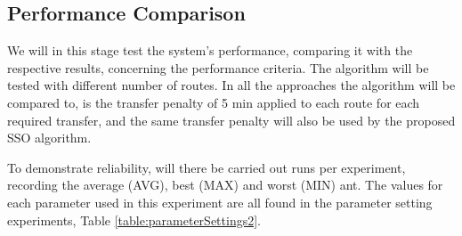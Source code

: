 \subsection{Performance Comparison}
\label{subsec:performanceComparison_setup}
We will in this stage test the system's performance, comparing it with the respective results, concerning the performance criteria. The algorithm will be tested with different number of routes. In all the approaches the algorithm will be compared to, is the transfer penalty of 5 min applied to each route for each required transfer, and the same transfer penalty will also be used by the proposed SSO algorithm.

To demonstrate reliability, will there be carried out runs per experiment, recording the average (AVG), best (MAX) and worst (MIN) ant. The values for each parameter used in this experiment are all found in the parameter setting experiments, Table \vref{table:parameterSettings2}.










